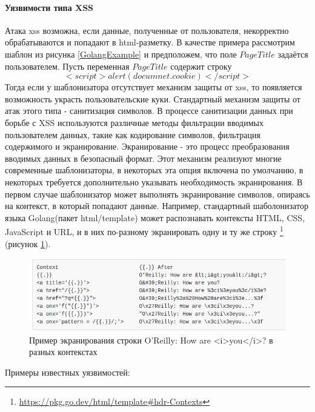 \documentclass[a4paper]{article}
\begin{document}
\paragraph{Уязвимости типа XSS}
\indent

Атака xss возможна, если данные, полученные от пользователя, некорректно обрабатываются и попадают в html-разметку. В качестве примера рассмотрим шаблон из рисунка \ref{GolangExample} и предположем, что поле $PageTitle$ задаётся пользователем. Пусть переменная $PageTitle$ содержит строку $$<script>alert(documnet.cookie)</script>$$ Тогда если у шаблонизатора отсутствует механизм защиты от xss, то появляется возможность украсть пользовательские куки. Стандартный механизм защиты от атак этого типа - санитизация символов. В процессе санитизации данных при борьбе с XSS используются различные методы фильтрации вводимых пользователем данных, такие как кодирование символов, фильтрация содержимого и экранирование. Экранирование - это процесс преобразования вводимых данных в безопасный формат. Этот механизм реализуют многие современные шаблонизаторы, в некоторых эта опция включена по умолчанию, в некоторых требуется дополнительно указывать необходимость экранирования. В первом случае шаблонизатор может выполнять экранирование символов, опираясь на контекст, в который попадают данные. Например, стандартный шаболонизатор языка Golang(пакет html/template) может распознавать контексты HTML, CSS, JavaScript и URL, и в них по-разному экранировать одну и ту же строку \footnote{\href{https://pkg.go.dev/html/template\#hdr-Contexts}{https://pkg.go.dev/html/template\#hdr-Contexts}} (рисунок \ref{GoEscaping}).

\begin{figure}[ht!]
    \includegraphics[width=140mm]{GoEscaping.png}
    \caption{Пример экранирования строки O'Reilly: How are <i>you</i>? в разных контекстах}
    \label{GoEscaping}
    \end{figure}

Примеры известных уязвимостей:
\end{document}
